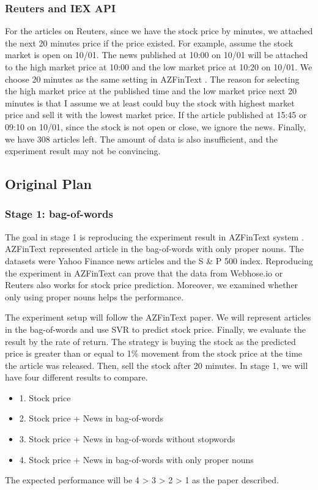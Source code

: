 \documentclass[sigconf]{acmart}
\begin{document}
\subsubsection{Reuters and IEX API}
For the articles on Reuters, since we have the stock price by minutes, we attached the next 20 minutes price if the price existed. For example, assume the stock market is open on 10/01. The news published at 10:00
on 10/01 will be attached to the high market price at 10:00 and the low market price at 10:20 on 10/01. We choose 20 minutes as the same setting in  AZFinText \cite{AZFinText}. The reason for selecting the high market
price at the published time and the low market price next 20 minutes is that I assume we at least could buy the stock with highest market price and sell it with the lowest market price. If the article published at 15:45
or 09:10 on 10/01, since the stock is not open or close, we ignore the news. Finally, we have 308 articles left. The amount of data is also insufficient, and the experiment result may not be convincing.

\subsection{Original Plan} \label{plan}
\subsubsection{Stage 1: bag-of-words}
	The goal in stage 1 is reproducing the experiment result in AZFinText system \cite{AZFinText}. AZFinText represented article in the bag-of-words with only proper nouns. The datasets were Yahoo Finance news 
	articles and the S \& P 500 index. Reproducing the experiment in AZFinText can prove that the data from Webhose.io or Reuters also works for stock price prediction. Moreover, we examined whether only using 
	proper nouns helps the performance.

	The experiment setup will follow the AZFinText paper. We will represent articles in the bag-of-words and use SVR to predict stock price. Finally, we evaluate the result by the rate of return.
	The strategy is buying the stock as the predicted price is greater than or equal to 1\% movement from the stock price at the time the article was released. Then, sell the stock after 20 minutes.
	In stage 1, we will have four different results to compare.
	\\
	\begin{itemize}
		\item 1. Stock price
		\item 2. Stock price + News in bag-of-words
		\item 3. Stock price + News in bag-of-words without stopwords
		\item 4. Stock price + News in bag-of-words with only proper nouns
	\end{itemize}
	The expected performance will be 4 > 3 > 2 > 1 as the paper described.
\end{document}
